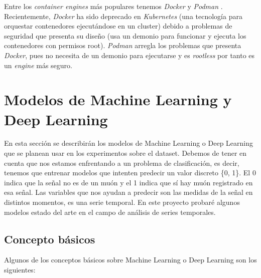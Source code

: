 Entre los \textit{container engines} más populares tenemos \textit{Docker} \cite{docker} y \textit{Podman} \cite{podman}. Recientemente, \textit{Docker} ha sido deprecado en \textit{Kubernetes} (una tecnología para orquestar contenedores ejecutándose en un cluster) debido a problemas de seguridad que presenta su diseño (usa un demonio para funcionar y ejecuta los contenedores con permisos root). \textit{Podman} arregla los problemas que presenta \textit{Docker}, pues no necesita de un demonio para ejecutarse y es \textit{rootless} por tanto es un \textit{engine} más seguro.

\section{Modelos de Machine Learning y Deep Learning}

En esta sección se describirán los modelos de Machine Learning o Deep Learning que se planean usar en los experimentos sobre el dataset. Debemos de tener en cuenta que nos estamos enfrentando a un problema de clasificación, es decir, tenemos que entrenar modelos que intenten predecir un valor discreto \{0, 1\}. El 0 indica que la señal no es de un muón y el 1 indica que sí hay muón registrado en esa señal. Las variables que nos ayudan a predecir son las medidas de la señal en distintos momentos, es una serie temporal. En este proyecto probaré algunos modelos estado del arte en el campo de análisis de series temporales.

\subsection{Concepto básicos}

Algunos de los conceptos básicos sobre Machine Learning o Deep Learning son los siguientes:

